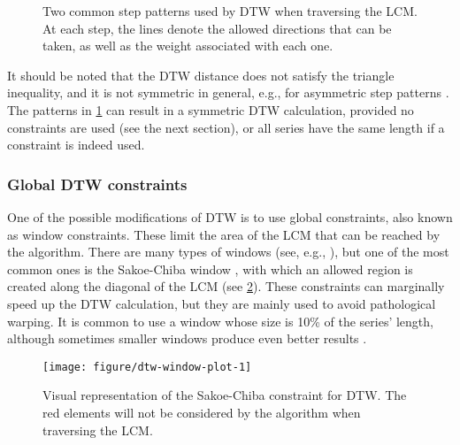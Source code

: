 \begin{figure}[htbp]

{\centering {}

}

\caption{Two common step patterns used by DTW when traversing the LCM. At each step, the lines denote the allowed directions that can be taken, as well as the weight associated with each one.}\label{fig:step-patterns}
\end{figure}

It should be noted that the DTW distance does not satisfy the triangle inequality,
and it is not symmetric in general,
e.g., for asymmetric step patterns \citep{giorgino2009}.
The patterns in \cref{fig:step-patterns} can result in a symmetric DTW calculation,
provided no constraints are used (see the next section),
or all series have the same length if a constraint is indeed used.

\subsubsection{Global DTW constraints}
\label{sec:dtw-window}

One of the possible modifications of DTW is to use global constraints,
also known as window constraints.
These limit the area of the LCM that can be reached by the algorithm.
There are many types of windows (see, e.g., \citet{giorgino2009}),
but one of the most common ones is the Sakoe-Chiba window \citep{sakoe1978},
with which an allowed region is created along the diagonal of the LCM (see \cref{fig:dtw-window-plot}).
These constraints can marginally speed up the DTW calculation,
but they are mainly used to avoid pathological warping.
It is common to use a window whose size is 10\% of the series' length,
although sometimes smaller windows produce even better results \citep{keogh2004}.

\begin{figure}[htbp]

{\centering \texttt{[image: figure/dtw-window-plot-1]}

}

\caption{Visual representation of the Sakoe-Chiba constraint for DTW. The red elements will not be considered by the algorithm when traversing the LCM.}\label{fig:dtw-window-plot}
\end{figure}

